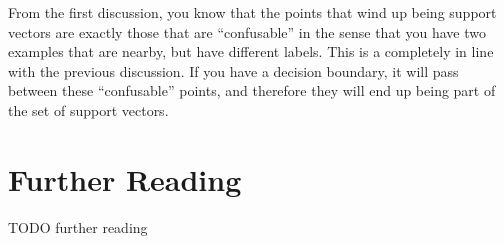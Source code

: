 From the first discussion, you know that the points that wind up being
support vectors are exactly those that are ``confusable'' in the sense
that you have two examples that are nearby, but have different labels.
This is a completely in line with the previous discussion.  If you
have a decision boundary, it will pass between these ``confusable''
points, and therefore they will end up being part of the set of
support vectors.

\begin{comment}
\section{Kernelized Regression}

Now, consider another example: linear regression (from
Section~\ref{sec:loss:reg}).  This was a linear model, under which $y
= \dotp{\vw}{\vx}+b$ and where the optimal weights are given in closed
form by:
%
\begin{align}
  \textcolor{darkred}{\vw} &= \textcolor{darkblue}{\left( \mat X \T \mat X + \la \eye_D \right)}\inv \textcolor{darkergreen}{\mat X \T \vec Y}
\end{align}
%
where $\mat X$ is the $N\times D$ data matrix, $\la$ is a
regularization parameter and $\vec Y$ is the $N\times 1$ vector of
labels.

This algorithm is, in some ways, even easier to kernelize than the
perceptron.  The optimal solution has a closed form, and
\end{comment}

\section{Further Reading}

TODO further reading





